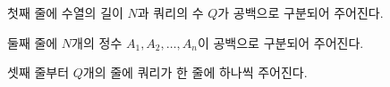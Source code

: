 첫째 줄에 수열의 길이 $N$과 쿼리의 수 $Q$가 공백으로 구분되어 주어진다. 

둘째 줄에 $N$개의 정수 $A_1,A_2,\dots,A_n$이 공백으로 구분되어 주어진다. 

셋째 줄부터 $Q$개의 줄에 쿼리가 한 줄에 하나씩 주어진다.

